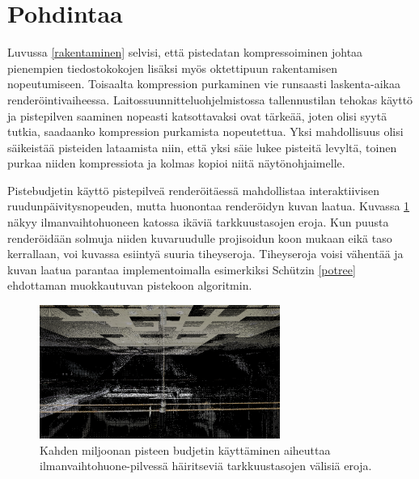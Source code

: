 \section{Pohdintaa}

Luvussa \ref{rakentaminen} selvisi, että pistedatan kompressoiminen johtaa pienempien tiedostokokojen lisäksi myös oktettipuun rakentamisen nopeutumiseen. Toisaalta kompression purkaminen vie runsaasti laskenta-aikaa renderöintivaiheessa. Laitossuunnitteluohjelmistossa tallennustilan tehokas käyttö ja pistepilven saaminen nopeasti katsottavaksi ovat tärkeää, joten olisi syytä tutkia, saadaanko kompression purkamista nopeutettua. Yksi mahdollisuus olisi säikeistää pisteiden lataamista niin, että yksi säie lukee pisteitä levyltä, toinen purkaa niiden kompressiota ja kolmas kopioi niitä näytönohjaimelle.

Pistebudjetin käyttö pistepilveä renderöitäessä mahdollistaa interaktiivisen ruudunpäivitysnopeuden, mutta huonontaa renderöidyn kuvan laatua. Kuvassa \ref{lod_border} näkyy ilmanvaihtohuoneen katossa ikäviä tarkkuustasojen eroja. Kun puusta renderöidään solmuja niiden kuvaruudulle projisoidun koon mukaan eikä taso kerrallaan, voi kuvassa esiintyä suuria tiheyseroja. Tiheyseroja voisi vähentää ja kuvan laatua parantaa implementoimalla esimerkiksi Schützin \ref{potree} ehdottaman muokkautuvan pistekoon algoritmin. 

\begin{figure}[h]
    \centering
    \includegraphics[width=0.7\textwidth]{tuloksia/ilmastointi_2M/ilmastointihuone_vesijohto_overviewbuf.png}
    \caption{Kahden miljoonan pisteen budjetin käyttäminen aiheuttaa ilmanvaihtohuone-pilvessä häiritseviä tarkkuustasojen välisiä eroja.}
    \label{lod_border}
\end{figure}
